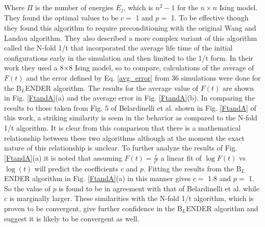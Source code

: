 \documentclass[aps,pre,reprint,superscriptaddress,showkeys]{revtex4-1}
\begin{document}
Where $\Pi$ is the number of energies $E_j$, which is ${n^2} -1$ for the $n\times n$  Ising model.   They found the optimal values to be $c=$ 1 and $p=$ 1. To be effective though they found this algorithm to require preconditioning with the original Wang and Landau algorithm. They also described a more complex variant of this algorithm called the N-fold 1/t  that incorporated the average life time of the initial configurations early in the simulation and then limited to the 1/t form. In their work they used a 8$\times$8 Ising model, so to compare, calculations of the average of $F(t)$ and the error defined by Eq. \ref{avg_error} from 36 simulations were done for the B$_L$ENDER algorithm. The results for the average value of $F(t)$ are shown in  Fig. \ref{FtandA}(a) and the average error in Fig. \ref{FtandA}(b). In comparing the results to those taken from Fig. 5 of Belardinelli et al. \cite{saturation} shown in   Fig. \ref{FtandA} of this work, a striking similarity is seem in the behavior as compared to the N-fold 1/t algorithm. It is clear from this comparison that there is a mathematical relationship between these two algorithms although at the moment the exact nature of this relationship is unclear.  To further analyze the results of  Fig. \ref{FtandA}(a) it is noted that assuming $F(t) = \frac{c}{t^p}$  a linear fit of  $\log F(t)$ vs $\log(t)$ will predict the coefficients $c$ and $p$. Fitting the results from the B$_L$ENDER algorithm in Fig. \ref{FtandA}(a) in this manner gives $c=$ 1.8 and $p=$ 1. So the value of $p$ is found to be in agreement with that of Belardinelli et al. while $c$ is marginally larger. These similarities with the N-fold 1/t algorithm, which is proven to be convergent, give further confidence in the B$_L$ENDER algorithm and suggest it is likely to be convergent as well.
\end{document}
